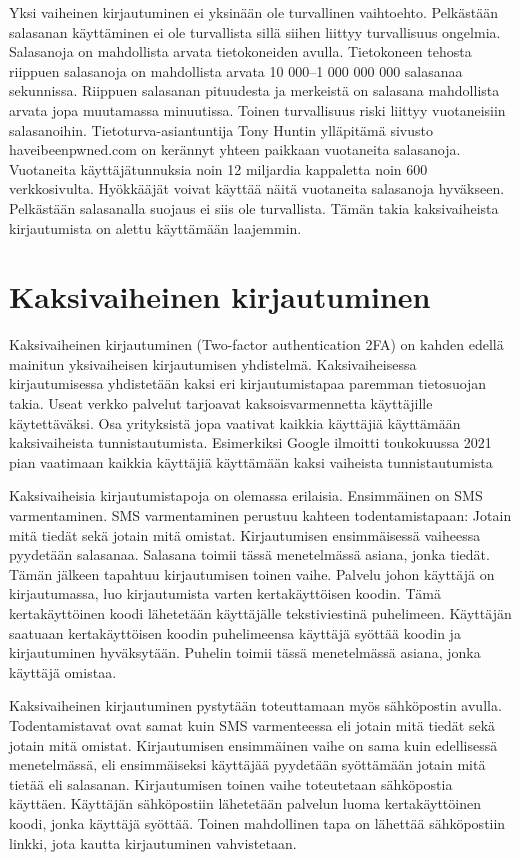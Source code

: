 Yksi vaiheinen kirjautuminen ei yksinään ole turvallinen vaihtoehto. Pelkästään salasanan käyttäminen ei ole turvallista sillä siihen liittyy turvallisuus ongelmia. Salasanoja on mahdollista arvata tietokoneiden avulla. Tietokoneen tehosta riippuen salasanoja on mahdollista arvata 10 000–1 000 000 000 salasanaa sekunnissa. Riippuen salasanan pituudesta ja merkeistä on salasana mahdollista arvata jopa muutamassa minuutissa. \citep{brute_force_attack} Toinen turvallisuus riski liittyy vuotaneisiin salasanoihin. Tietoturva-asiantuntija Tony Huntin ylläpitämä sivusto haveibeenpwned.com on kerännyt yhteen paikkaan vuotaneita salasanoja. Vuotaneita käyttäjätunnuksia noin 12 miljardia kappaletta noin 600 verkkosivulta. \citep{Have_i_been_pwned} Hyökkääjät voivat käyttää näitä vuotaneita salasanoja hyväkseen. Pelkästään salasanalla suojaus ei siis ole turvallista. Tämän takia kaksivaiheista kirjautumista on alettu käyttämään laajemmin.
 

\section{Kaksivaiheinen kirjautuminen}
Kaksivaiheinen kirjautuminen (Two-factor authentication 2FA) on kahden edellä mainitun yksivaiheisen kirjautumisen yhdistelmä. Kaksivaiheisessa kirjautumisessa yhdistetään kaksi eri kirjautumistapaa paremman tietosuojan takia. 
Useat verkko palvelut tarjoavat kaksoisvarmennetta käyttäjille käytettäväksi. Osa yrityksistä jopa vaativat kaikkia käyttäjiä käyttämään kaksivaiheista tunnistautumista. Esimerkiksi Google ilmoitti toukokuussa 2021 pian vaatimaan kaikkia käyttäjiä käyttämään kaksi vaiheista tunnistautumista \citep{future_without_passwords}


Kaksivaiheisia kirjautumistapoja on olemassa erilaisia. Ensimmäinen on SMS varmentaminen. SMS varmentaminen perustuu kahteen todentamistapaan: Jotain mitä tiedät sekä jotain mitä omistat. Kirjautumisen ensimmäisessä vaiheessa pyydetään salasanaa. Salasana toimii tässä menetelmässä asiana, jonka tiedät. Tämän jälkeen tapahtuu kirjautumisen toinen vaihe. Palvelu johon käyttäjä on kirjautumassa, luo kirjautumista varten kertakäyttöisen koodin. Tämä kertakäyttöinen koodi lähetetään käyttäjälle tekstiviestinä puhelimeen. Käyttäjän saatuaan kertakäyttöisen koodin puhelimeensa käyttäjä syöttää koodin ja kirjautuminen hyväksytään. Puhelin toimii tässä menetelmässä asiana, jonka käyttäjä omistaa.

Kaksivaiheinen kirjautuminen pystytään toteuttamaan myös sähköpostin avulla. Todentamistavat ovat samat kuin SMS varmenteessa eli jotain mitä tiedät sekä jotain mitä omistat. Kirjautumisen ensimmäinen vaihe on sama kuin edellisessä menetelmässä, eli ensimmäiseksi käyttäjää pyydetään syöttämään jotain mitä tietää eli salasanan. Kirjautumisen toinen vaihe toteutetaan sähköpostia käyttäen. Käyttäjän sähköpostiin lähetetään palvelun luoma kertakäyttöinen koodi, jonka käyttäjä syöttää. Toinen mahdollinen tapa on lähettää sähköpostiin linkki, jota kautta kirjautuminen vahvistetaan.

